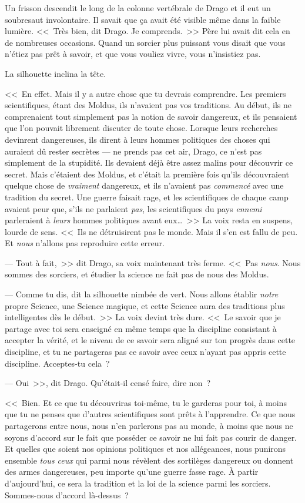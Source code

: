 Un frisson descendit le long de la colonne vertébrale de Drago et il eut un soubresaut involontaire. Il savait que ça avait été visible même dans la faible lumière. <<~Très bien, dit Drago. Je comprends.~>> Père lui avait dit cela en de nombreuses occasions. Quand un sorcier plus puissant vous disait que vous n'étiez pas prêt à savoir, et que vous vouliez vivre, vous n'insistiez pas.

La silhouette inclina la tête.

<<~En effet. Mais il y a autre chose que tu devrais comprendre. Les premiers scientifiques, étant des Moldus, ils n'avaient pas vos traditions. Au début, ils ne comprenaient tout simplement pas la notion de savoir dangereux, et ils pensaient que l'on pouvait librement discuter de toute chose. Lorsque leurs recherches devinrent dangereuses, ils dirent à leurs hommes politiques des choses qui auraient dû rester secrètes — ne prends pas cet air, Drago, ce n'est pas simplement de la stupidité. Ils devaient déjà être assez malins pour découvrir ce secret. Mais c'étaient des Moldus, et c'était la première fois qu'ils découvraient quelque chose de \emph{vraiment} dangereux, et ils n'avaient pas \emph{commencé} avec une tradition du secret. Une guerre faisait rage, et les scientifiques de chaque camp avaient peur que, s'ils ne parlaient \emph{pas}, les scientifiques du pays \emph{ennemi} parleraient à \emph{leurs} hommes politiques avant eux…~>> La voix resta en suspens, lourde de sens. <<~Ils ne détruisirent pas le monde. Mais il s'en est fallu de peu. Et \emph{nous} n'allons pas reproduire cette erreur.

--- Tout à fait,~>> dit Drago, sa voix maintenant très ferme. <<~Pas \emph{nous}. Nous sommes des sorciers, et étudier la science ne fait pas de nous des Moldus.

--- Comme tu dis, dit la silhouette nimbée de vert. Nous allons établir \emph{notre} propre Science, une Science magique, et cette Science aura des traditions plus intelligentes dès le début.~>> La voix devint très dure. <<~Le savoir que je partage avec toi sera enseigné en même temps que la discipline consistant à accepter la vérité, et le niveau de ce savoir sera aligné sur ton progrès dans cette discipline, et tu ne partageras pas ce savoir avec ceux n'ayant pas appris cette discipline. Acceptes-tu cela~?

--- Oui~>>, dit Drago. Qu'était-il censé faire, dire non~?

<<~Bien. Et ce que tu découvriras toi-même, tu le garderas pour toi, à moins que tu ne penses que d'autres scientifiques sont prêts à l'apprendre. Ce que nous partagerons entre nous, nous n'en parlerons pas au monde, à moins que nous ne soyons d'accord sur le fait que posséder ce savoir ne lui fait pas courir de danger. Et quelles que soient nos opinions politiques et nos allégeances, nous punirons ensemble \emph{tous ceux} qui parmi nous révèlent des sortilèges dangereux ou donnent des armes dangereuses, peu importe qu'une guerre fasse rage. À partir d'aujourd'hui, ce sera la tradition et la loi de la science parmi les sorciers. Sommes-nous d'accord là-dessus~?

